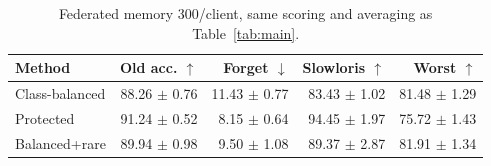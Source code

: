 \begin{table}[t]
\centering
\caption{Federated memory 300/client, same scoring and averaging as Table~\ref{tab:main}.}
\label{tab:capacity}
\footnotesize
\setlength{\tabcolsep}{2.5pt}
\begin{tabular}{lrrrr}
\toprule
Method & Old acc. $\uparrow$ & Forget $\downarrow$ & Slowloris $\uparrow$ & Worst $\uparrow$\\
\midrule
Class-balanced & 88.26 $\pm$ 0.76 & 11.43 $\pm$ 0.77 & 83.43 $\pm$ 1.02 & 81.48 $\pm$ 1.29\\
Protected & 91.24 $\pm$ 0.52 & 8.15 $\pm$ 0.64 & 94.45 $\pm$ 1.97 & 75.72 $\pm$ 1.43\\
Balanced+rare & 89.94 $\pm$ 0.98 & 9.50 $\pm$ 1.08 & 89.37 $\pm$ 2.87 & 81.91 $\pm$ 1.34\\
\bottomrule
\end{tabular}
\end{table}

